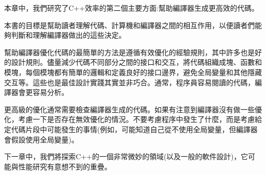 本章中，我們研究了C++效率的第二個主要方面:幫助編譯器生成更高效的代碼。 

本書的目標是幫助讀者理解代碼、計算機和編譯器之間的相互作用，以便讀者們能夠判斷和理解編譯器做出的這些決定。 

幫助編譯器優化代碼的最簡單的方法是遵循有效優化的經驗規則，其中許多也是好的設計規則。儘量減少代碼不同部分之間的接口和交互，將代碼組織成塊、函數和模塊，每個模塊都有簡單的邏輯和定義良好的接口邊界，避免全局變量和其他隱藏交互等。這些也是最佳設計實踐其實並非巧合。通常，程序員容易閱讀的代碼，編譯器會更容易分析。

更高級的優化通常需要檢查編譯器生成的代碼。如果有注意到編譯器沒有做一些優化，考慮一下是否存在無效優化的情況。不要考慮程序中發生了什麼，而是考慮給定代碼片段中可能發生的事情(例如，可能知道自己從不使用全局變量，但編譯器會假設使用全局變量)。 

下一章中，我們將探索C++的一個非常微妙的領域(以及一般的軟件設計)，它可能與性能研究有意想不到的重疊。